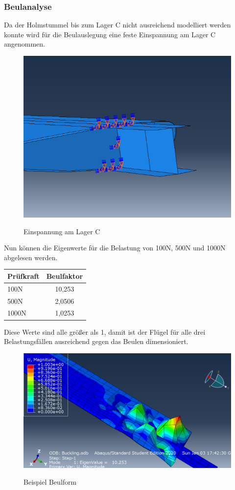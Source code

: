 \subsubsection{Beulanalyse}
Da der Holmstummel bis zum Lager C nicht ausreichend modelliert werden konnte wird für die Beulauslegung eine feste Einspannung am Lager C angenommen.\\
\begin{figure}[h]
 \centering
 \includegraphics[scale=0.4]{Bilder/Beuleinspannung}\\
 \label{Absenkung}
 \caption{Einspannung am Lager C}
\end{figure}
Nun können die Eigenwerte für die Belastung von 100N, 500N und 1000N abgelesen werden.
\begin{center}
\begin{tabular}[h]{l|c}
Prüfkraft&Beulfaktor\\
\hline
100N&10,253\\
500N&2,0506\\
1000N&1,0253\\
\end{tabular}
\end{center}

Diese Werte sind alle größer als 1, damit ist der Flügel für alle drei Belastungsfällen ausreichend gegen das Beulen dimensioniert.\\
\begin{figure}[h]
 \centering
 \includegraphics[scale=0.4]{Bilder/Beulen100N}\\
 \label{Beulform}
 \caption{Beispiel Beulform}
\end{figure}
\newpage

 

  
